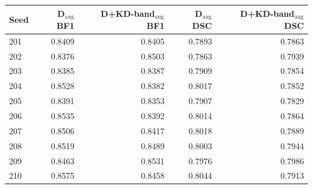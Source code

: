 \begin{tabular}{@{}lrrrr@{}}
\toprule
Seed & D$_{\mathrm{aug}}$ BF1 & D+KD-band$_{\mathrm{aug}}$ BF1 & D$_{\mathrm{aug}}$ DSC & D+KD-band$_{\mathrm{aug}}$ DSC \\
\midrule
201 & 0.8409 & 0.8405 & 0.7893 & 0.7863 \\
202 & 0.8376 & 0.8503 & 0.7863 & 0.7939 \\
203 & 0.8385 & 0.8387 & 0.7909 & 0.7854 \\
204 & 0.8528 & 0.8382 & 0.8017 & 0.7852 \\
205 & 0.8391 & 0.8353 & 0.7907 & 0.7829 \\
206 & 0.8535 & 0.8392 & 0.8014 & 0.7864 \\
207 & 0.8506 & 0.8417 & 0.8018 & 0.7889 \\
208 & 0.8519 & 0.8489 & 0.8003 & 0.7944 \\
209 & 0.8463 & 0.8531 & 0.7976 & 0.7986 \\
210 & 0.8575 & 0.8458 & 0.8044 & 0.7913 \\
\bottomrule
\end{tabular}
